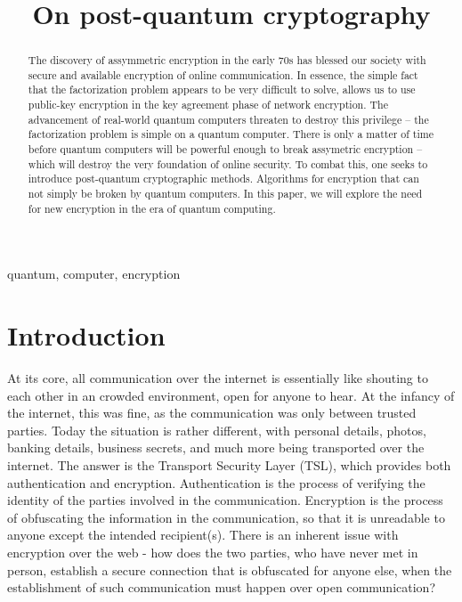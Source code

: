 \documentclass[conference]{IEEEtran}
\begin{document}
\title{On post-quantum cryptography}

\author{
}

\maketitle

\begin{abstract}
  The discovery of assymmetric encryption in the early 70s has blessed our society with secure and available encryption of online communication.
  In essence, the simple fact that the factorization problem appears to be very difficult to solve, allows us to use public-key encryption in the key agreement phase of network encryption.
  The advancement of real-world quantum computers threaten to destroy this privilege -- the factorization problem is simple on a quantum computer.
  There is only a matter of time before quantum computers will be powerful enough to break assymetric encryption -- which will destroy the very foundation of online security.
  To combat this, one seeks to introduce post-quantum cryptographic methods.
  Algorithms for encryption that can not simply be broken by quantum computers.
  In this paper, we will explore the need for new encryption in the era of quantum computing.
\end{abstract}

\begin{IEEEkeywords}
quantum, computer, encryption
\end{IEEEkeywords}

\section{Introduction}
At its core, all communication over the internet is essentially like shouting to each other in an crowded environment, open for anyone to hear.
At the infancy of the internet, this was fine, as the communication was only between trusted parties.
Today the situation is rather different, with personal details, photos, banking details, business secrets, and much more being transported over the internet.
The answer is the Transport Security Layer (TSL), which provides both authentication and encryption.
Authentication is the process of verifying the identity of the parties involved in the communication.
Encryption is the process of obfuscating the information in the communication, so that it is unreadable to anyone except the intended recipient(s).
There is an inherent issue with encryption over the web - how does the two parties, who have never met in person, establish a secure connection that is obfuscated for anyone else, when the establishment of such communication must happen over open communication?
\end{document}
